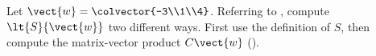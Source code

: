 Let $\vect{w}=\colvector{-3\\1\\4}$.  Referring to , compute $\lt{S}{\vect{w}}$ two different ways.  First use the definition of $S$, then compute the matrix-vector product $C\vect{w}$ ().